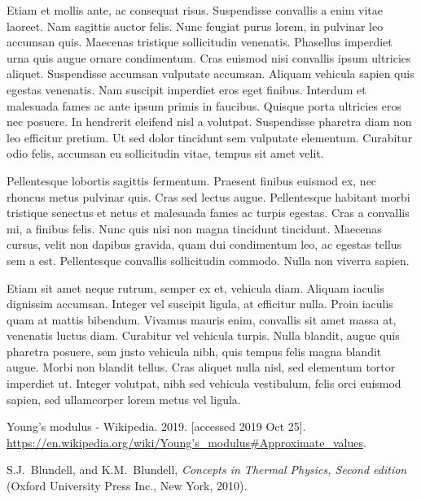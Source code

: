\documentclass[
    a4paper,
    twocolumn,
    aps, pra,
    superscriptaddress,
    amsmath,amssymb
]{revtex4-2}
\theoremstyle{definition}
\begin{document}
Etiam et mollis ante, ac consequat risus. Suspendisse convallis a enim vitae laoreet. Nam
sagittis auctor felis. Nunc feugiat purus lorem, in pulvinar leo accumsan quis. Maecenas
tristique sollicitudin venenatis. Phasellus imperdiet urna quis augue ornare condimentum. Cras
euismod nisi convallis ipsum ultricies aliquet.
Suspendisse accumsan vulputate accumsan. Aliquam
vehicula sapien quis egestas venenatis. Nam suscipit imperdiet eros eget finibus. Interdum et
malesuada fames ac ante ipsum primis in faucibus. Quisque porta ultricies eros nec posuere. In
hendrerit eleifend nisl a volutpat. Suspendisse pharetra diam non leo efficitur pretium. Ut sed
dolor tincidunt sem vulputate elementum. Curabitur odio felis, accumsan eu sollicitudin vitae,
tempus sit amet velit.

Pellentesque lobortis sagittis fermentum. Praesent finibus euismod ex, nec rhoncus metus
pulvinar quis. Cras sed lectus augue. Pellentesque habitant morbi tristique senectus et netus et
malesuada fames ac turpis egestas. Cras a convallis mi, a finibus felis. Nunc quis nisi non
magna tincidunt tincidunt. Maecenas cursus, velit non dapibus gravida, quam dui condimentum leo,
ac egestas tellus sem a est. Pellentesque convallis sollicitudin commodo. Nulla non viverra
sapien.

Etiam sit amet neque rutrum, semper ex et, vehicula diam. Aliquam iaculis dignissim accumsan.
Integer vel suscipit ligula, at efficitur nulla. Proin iaculis quam at mattis bibendum. Vivamus
mauris enim, convallis sit amet massa at, venenatis luctus diam. Curabitur vel vehicula turpis.
Nulla blandit, augue quis pharetra posuere, sem justo vehicula nibh, quis tempus felis magna blandit
augue. Morbi non blandit tellus. Cras aliquet nulla nisl, sed elementum tortor imperdiet ut. Integer
volutpat, nibh sed vehicula vestibulum, felis orci euismod sapien, sed ullamcorper lorem metus vel
ligula.

\begin{thebibliography}{10}

 Young's modulus - Wikipedia. 2019. [accessed 2019 Oct 25].  \url{https://en.wikipedia.org/wiki/Young's_modulus#Approximate_values}.

S.J.~Blundell, and K.M.~Blundell, \textit{Concepts in Thermal Physics, Second edition} (Oxford University Press Inc., New York, 2010).

\end{thebibliography}
\end{document}
